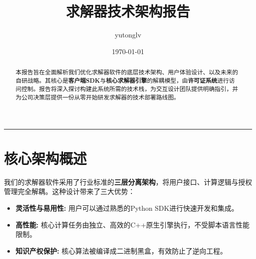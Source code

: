 \documentclass[a4paper, 12pt]{article}
\begin{document}
\title{
    \vspace{-1.5cm}
    \textbf{\Huge 求解器技术架构报告}
    \vspace{0.5cm}
}
\author{yutonglv}
\date{\today}
\maketitle
\hrule
\vspace{1cm}

\begin{abstract}
    \noindent
    本报告旨在全面解析我们优化求解器软件的底层技术架构、用户体验设计、以及未来的自研战略。其核心是\textbf{客户端SDK}与\textbf{核心求解器引擎}的解耦模型，由\textbf{许可证系统}进行访问控制。报告将深入探讨构建此系统所需的技术栈，为交互设计团队提供明确指引，并为公司决策层提供一份从零开始研发求解器的技术部署路线图。
\end{abstract}
\vspace{1cm}

\tableofcontents
\newpage

\section{核心架构概述}
我们的求解器软件采用了行业标准的\textbf{三层分离架构}，将用户接口、计算逻辑与授权管理完全解耦。这种设计带来了三大优势：
\begin{itemize}
    \item \textbf{灵活性与易用性:} 用户可以通过熟悉的Python SDK进行快速开发和集成。
    \item \textbf{高性能:} 核心计算任务由独立、高效的C++原生引擎执行，不受脚本语言性能限制。
    \item \textbf{知识产权保护:} 核心算法被编译成二进制黑盒，有效防止了逆向工程。
\end{itemize}
\end{document}
